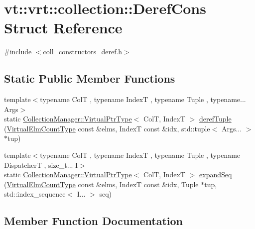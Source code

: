 \hypertarget{structvt_1_1vrt_1_1collection_1_1_deref_cons}{}\section{vt\+:\+:vrt\+:\+:collection\+:\+:Deref\+Cons Struct Reference}
\label{structvt_1_1vrt_1_1collection_1_1_deref_cons}


{\ttfamily \#include $<$coll\+\_\+constructors\+\_\+deref.\+h$>$}

\subsection*{Static Public Member Functions}
\begin{DoxyCompactItemize}
\item 
{\footnotesize template$<$typename ColT , typename IndexT , typename Tuple , typename... Args$>$ }\\static \hyperlink{structvt_1_1vrt_1_1collection_1_1_collection_manager_a1da9015e52d6ecca955f57b59aab0b82}{Collection\+Manager\+::\+Virtual\+Ptr\+Type}$<$ ColT, IndexT $>$ \hyperlink{structvt_1_1vrt_1_1collection_1_1_deref_cons_ae5c1ab1384e3ac40fe64875e7c822eb7}{deref\+Tuple} (\hyperlink{namespacevt_ac115668758184050beff7a9281a2c490}{Virtual\+Elm\+Count\+Type} const \&elms, IndexT const \&idx, std\+::tuple$<$ Args... $>$ $\ast$tup)
\item 
{\footnotesize template$<$typename ColT , typename IndexT , typename Tuple , typename DispatcherT , size\+\_\+t... I$>$ }\\static \hyperlink{structvt_1_1vrt_1_1collection_1_1_collection_manager_a1da9015e52d6ecca955f57b59aab0b82}{Collection\+Manager\+::\+Virtual\+Ptr\+Type}$<$ ColT, IndexT $>$ \hyperlink{structvt_1_1vrt_1_1collection_1_1_deref_cons_a557c69641faad74bcf17f5cc737fb816}{expand\+Seq} (\hyperlink{namespacevt_ac115668758184050beff7a9281a2c490}{Virtual\+Elm\+Count\+Type} const \&elms, IndexT const \&idx, Tuple $\ast$tup, std\+::index\+\_\+sequence$<$ I... $>$ seq)
\end{DoxyCompactItemize}


\subsection{Member Function Documentation}
\mbox{\label{structvt_1_1vrt_1_1collection_1_1_deref_cons_ae5c1ab1384e3ac40fe64875e7c822eb7}} 
